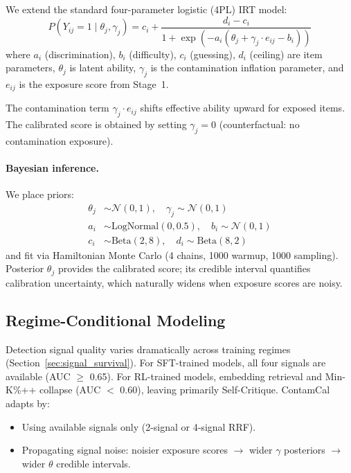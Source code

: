 \documentclass[letterpaper,11pt]{article}
\begin{document}
We extend the standard four-parameter logistic (4PL) IRT model:
\begin{equation}
    P(Y_{ij}=1 \mid \theta_j, \gamma_j) = c_i + \frac{d_i - c_i}{1 + \exp(-a_i(\theta_j + \gamma_j \cdot e_{ij} - b_i))}
\end{equation}
where $a_i$ (discrimination), $b_i$ (difficulty), $c_i$ (guessing), $d_i$ (ceiling) are item parameters, $\theta_j$ is latent ability, $\gamma_j$ is the contamination inflation parameter, and $e_{ij}$ is the exposure score from Stage~1.

The contamination term $\gamma_j \cdot e_{ij}$ shifts effective ability upward for exposed items. The calibrated score is obtained by setting $\gamma_j = 0$ (counterfactual: no contamination exposure).

\paragraph{Bayesian inference.} We place priors:
\begin{align}
    \theta_j &\sim \mathcal{N}(0, 1), \quad \gamma_j \sim \mathcal{N}(0, 1) \\
    a_i &\sim \text{LogNormal}(0, 0.5), \quad b_i \sim \mathcal{N}(0, 1) \\
    c_i &\sim \text{Beta}(2, 8), \quad d_i \sim \text{Beta}(8, 2)
\end{align}
and fit via Hamiltonian Monte Carlo (4 chains, 1000 warmup, 1000 sampling). Posterior $\theta_j$ provides the calibrated score; its credible interval quantifies calibration uncertainty, which naturally widens when exposure scores are noisy.

\subsection{Regime-Conditional Modeling}

Detection signal quality varies dramatically across training regimes (Section~\ref{sec:signal_survival}). For SFT-trained models, all four signals are available (AUC $\geq$ 0.65). For RL-trained models, embedding retrieval and Min-K\%++ collapse (AUC $<$ 0.60), leaving primarily Self-Critique. ContamCal adapts by:
\begin{itemize}
    \item Using available signals only (2-signal or 4-signal RRF).
    \item Propagating signal noise: noisier exposure scores $\to$ wider $\gamma$ posteriors $\to$ wider $\theta$ credible intervals.
\end{itemize}
\end{document}
